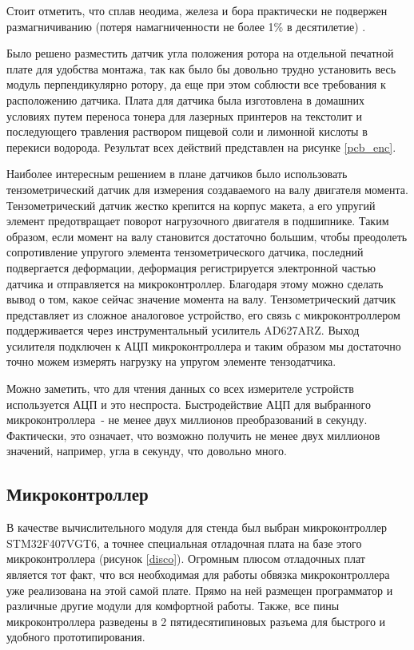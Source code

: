 
Стоит отметить, 
что сплав неодима, железа и бора практически не подвержен размагничиванию 
(потеря намагниченности не более 1\% в десятилетие) \cite{Магстанд}. 

Было решено разместить датчик угла положения ротора на отдельной печатной плате для
удобства монтажа, так как было бы довольно трудно установить весь модуль перпендикулярно ротору,
да еще при этом соблюсти все требования к расположению датчика.
Плата для датчика была изготовлена в домашних условиях путем переноса тонера для
лазерных принтеров на текстолит и последующего травления раствором пищевой соли и лимонной
кислоты в перекиси водорода. Результат всех действий представлен на рисунке \ref{pcb_enc}.


Наиболее интересным решением в плане датчиков было использовать тензометрический датчик
для измерения создаваемого на валу двигателя момента. Тензометрический датчик жестко крепится
на корпус макета, а его упругий элемент предотвращает поворот нагрузочного двигателя в подшипнике.
Таким образом, если момент на валу становится достаточно большим, чтобы преодолеть сопротивление
упругого элемента тензометрического датчика, последний подвергается деформации, деформация 
регистрируется
электронной частью датчика и отправляется на микроконтроллер. Благодаря этому можно сделать вывод
о том, какое сейчас значение момента на валу. Тензометрический датчик представляет из сложное аналоговое
устройство, его связь с микроконтроллером поддерживается через инструментальный усилитель AD627ARZ.
Выход усилителя подключен к АЦП микроконтроллера и таким образом мы достаточно точно можем измерять 
нагрузку на упругом элементе тензодатчика.

Можно заметить, что для чтения данных со всех измерителе устройств используется АЦП и это неспроста. 
Быстродействие АЦП для выбранного микроконтроллера~- не менее двух миллионов преобразований в секунду.
Фактически, это означает, что возможно получить не менее двух миллионов значений, например, 
угла в секунду, что довольно много.

\subsection{Микроконтроллер}

В качестве вычислительного модуля для стенда был выбран микроконтроллер STM32F407VGT6, 
а точнее специальная
отладочная плата на базе этого микроконтроллера (рисунок \ref{disco}). Огромным плюсом 
отладочных плат является тот факт, что
вся необходимая для работы обвязка микроконтроллера уже реализована на этой самой плате.
Прямо на ней размещен программатор и различные другие модули для комфортной работы.
Также, все пины микроконтроллера разведены в 2 пятидесятипиновых разъема для быстрого и удобного 
прототипирования.

